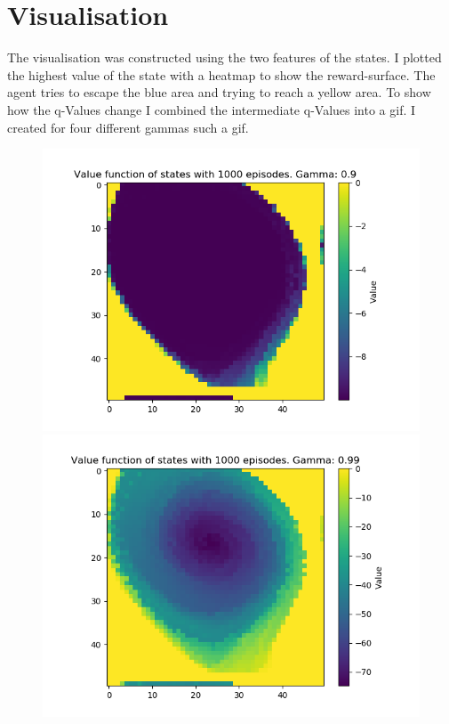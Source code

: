 \documentclass[a4paper]{article}
\begin{document}
\section{Visualisation}
The visualisation was constructed using the two features of the states. I plotted the highest value of the state with a heatmap to show the reward-surface. The agent tries to escape the blue area and trying to reach a yellow area. To show how the q-Values change I combined the intermediate q-Values into a gif. I created for four different gammas such a gif.


\begin{figure}
  \includegraphics[width=\linewidth]{"gamma 09"}
\endminipage\hfill
{}
  \includegraphics[width=\linewidth]{"gamma 099"}
\endminipage\hfill
\end{figure}
\end{document}
